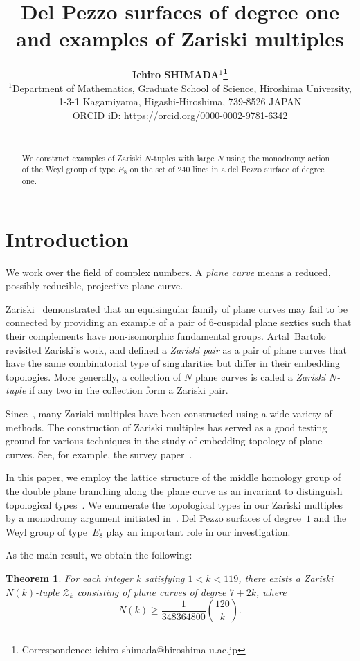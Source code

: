 \documentclass{math}
\title{Del Pezzo surfaces of degree one and examples of Zariski multiples }
\author[Ichiro Shimada]{
\textbf{Ichiro SHIMADA$^{1}$\thanks{Correspondence: ichiro-shimada@hiroshima-u.ac.jp}}\\
$^{1}$Department of Mathematics,
Graduate School of Science,
Hiroshima University,\\
1-3-1 Kagamiyama,
Higashi-Hiroshima,
739-8526 JAPAN
\\ ORCID iD: https://orcid.org/0000-0002-9781-6342\\
\\ [1.8em]

\rec{.202}
\acc{.202}
\finv{..202}
}
\theoremstyle{plain}
\newtheorem{theorem}{Theorem}[section]
\numberwithin{equation}{section}
\newcommand{\ZZZ}{\mathord{\mathcal Z}}
\begin{document}
\maketitle


\begin{abstract}
We construct examples of Zariski 
$N$-tuples with large 
$N$ using the monodromy action 
of the Weyl group of type $E_8$ on the set of $240$ lines in a del Pezzo surface of degree one.
%
\end{abstract}


\section{Introduction}
%
We work over the field of complex numbers.
A \emph{plane curve} means a reduced, possibly reducible, projective plane curve.
%
%
\par
%
Zariski~\cite{ZariskiA, ZariskiB} demonstrated that an equisingular family of plane curves may fail to be connected by 
providing an example of a pair of $6$-cuspidal plane sextics
such that  their complements %
have non-isomorphic fundamental groups.
Artal~Bartolo~\cite{Artal1994}  revisited Zariski's work, 
and defined  
a \emph{Zariski pair} 
as a pair of plane curves
 that have the same combinatorial type of singularities 
 but differ in their embedding topologies. 
 More generally, a collection of 
$N$ plane curves is called a \emph{Zariski  $N$-tuple}
 if any two  in the collection form a Zariski pair.
 \par
Since~\cite{Artal1994}, many Zariski multiples have been constructed 
using a wide variety of methods.
The construction of Zariski multiples %
has served as 
a good testing ground for various techniques in the study of embedding topology of plane curves.
See, for example,  the survey paper~\cite{TheSurvey}.
\par
In this paper,
we employ the lattice structure of the middle homology group of the double plane 
branching along the plane curve as an invariant to distinguish topological types~\cite{Shimada2010}.
We enumerate the topological types in our Zariski multiples  by a monodromy argument initiated in~\cite{Shimada2003}.
Del Pezzo surfaces of degree~$1$ and the Weyl group of type~$E_8$ play 
an important role in our investigation.
\par
As the main result, we obtain the following:
%
\begin{theorem}\label{thm:main1}
For each  integer $k$ satisfying $1<k<119$,
there exists a Zariski $N(k)$-tuple $\ZZZ_k$
consisting of plane curves of degree $7+2k$,
where 
%
\begin{equation}\label{eq:Nbinom}
N(k)\ge \frac{1}{348364800}\binom{120}{k}.
\end{equation}
%
\end{theorem}
\end{document}
